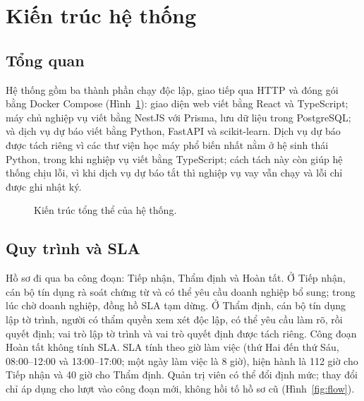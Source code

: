 \documentclass[journal]{IEEEtran}
\begin{document}
\section{Kiến trúc hệ thống}
\subsection{Tổng quan}
Hệ thống gồm ba thành phần chạy độc lập, giao tiếp qua HTTP và đóng gói bằng Docker Compose (Hình~\ref{fig:arch}): giao diện web viết bằng React và TypeScript; máy chủ nghiệp vụ viết bằng NestJS với Prisma, lưu dữ liệu trong PostgreSQL; và dịch vụ dự báo viết bằng Python, FastAPI và scikit-learn. Dịch vụ dự báo được tách riêng vì các thư viện học máy phổ biến nhất nằm ở hệ sinh thái Python, trong khi nghiệp vụ viết bằng TypeScript; cách tách này còn giúp hệ thống chịu lỗi, vì khi dịch vụ dự báo tắt thì nghiệp vụ vay vẫn chạy và lỗi chỉ được ghi nhật ký.

\begin{figure}[t]
\centering
{}
\caption{Kiến trúc tổng thể của hệ thống.}
\label{fig:arch}
\end{figure}

\subsection{Quy trình và SLA}
Hồ sơ đi qua ba công đoạn: Tiếp nhận, Thẩm định và Hoàn tất. Ở Tiếp nhận, cán bộ tín dụng rà soát chứng từ và có thể yêu cầu doanh nghiệp bổ sung; trong lúc chờ doanh nghiệp, đồng hồ SLA tạm dừng. Ở Thẩm định, cán bộ tín dụng lập tờ trình, người có thẩm quyền xem xét độc lập, có thể yêu cầu làm rõ, rồi quyết định; vai trò lập tờ trình và vai trò quyết định được tách riêng. Công đoạn Hoàn tất không tính SLA. SLA tính theo giờ làm việc (thứ Hai đến thứ Sáu, 08:00--12:00 và 13:00--17:00; một ngày làm việc là 8 giờ), hiện hành là 112 giờ cho Tiếp nhận và 40 giờ cho Thẩm định. Quản trị viên có thể đổi định mức; thay đổi chỉ áp dụng cho lượt vào công đoạn mới, không hồi tố hồ sơ cũ (Hình~\ref{fig:flow}).
\end{document}
